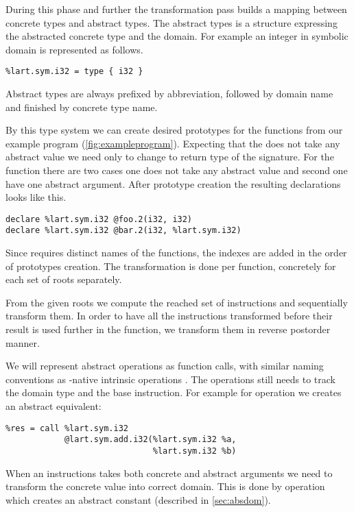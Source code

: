 During this phase and further the transformation pass builds a mapping between
concrete types and abstract types. The abstract types is a \LLVM structure
expressing the abstracted concrete type and the domain. For example an integer
in symbolic domain is represented as follows.

\begin{verbatim}
%lart.sym.i32 = type { i32 }
\end{verbatim}

Abstract types are always prefixed by  abbreviation, followed by
domain name and finished by concrete \LLVM type name.

By this type system we can create desired prototypes for the functions from our
example program (\autoref{fig:exampleprogram}). Expecting that the 
does not take any abstract value we need only to change to return type of the
signature. For the  function there are two cases one does not take any
abstract value and second one have one abstract argument. After prototype
creation the resulting \LLVM declarations looks like this.
\begin{verbatim}
declare %lart.sym.i32 @foo.2(i32, i32)
declare %lart.sym.i32 @bar.2(i32, %lart.sym.i32)
\end{verbatim}
Since \LLVM requires distinct names of the functions, the indexes are added in
the order of prototypes creation. The transformation is done per function,
concretely for each set of roots separately.

From the given roots we compute the reached set of instructions and sequentially
transform them. In order to have all the instructions transformed before their
result is used further in the function, we transform them in reverse postorder manner.

We will represent abstract operations as function calls, with similar naming
conventions as \LLVM-native intrinsic operations \cite{LLVM:langref}. The
operations still needs to track the domain type and the base \LLVM instruction.
For example for  operation we creates an abstract equivalent:
\begin{verbatim}
%res = call %lart.sym.i32
            @lart.sym.add.i32(%lart.sym.i32 %a,
                              %lart.sym.i32 %b)
\end{verbatim}

When an instructions takes both concrete and abstract arguments we need to
transform the concrete value into correct domain. This is done by 
operation which creates an abstract constant (described in
\autoref{sec:absdom}).

